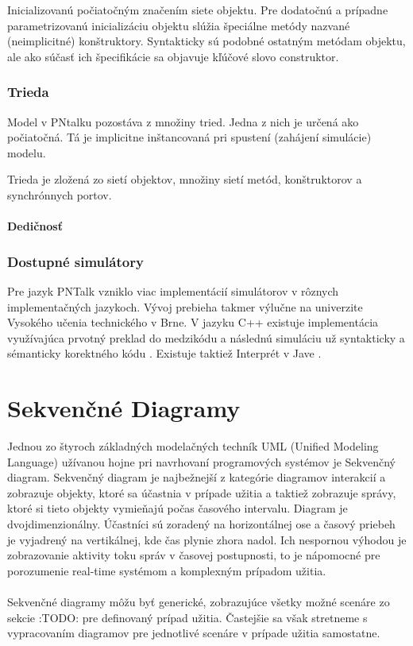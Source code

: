 Inicializovanú počiatočným značením siete objektu. Pre dodatočnú a prípadne parametrizovanú inicializáciu objektu slúžia špeciálne metódy nazvané (neimplicitné) konštruktory. Syntakticky sú podobné ostatným metódam objektu, ale ako súčasť ich špecifikácie sa objavuje kľúčové slovo construktor.

\subsection{Trieda}
Model v PNtalku pozostáva z množiny tried. Jedna z nich je určená ako počiatočná. Tá je implicitne inštancovaná pri spustení (zahájení simulácie) modelu.

Trieda je zložená zo sietí objektov, množiny sietí metód, konštruktorov a synchrónnych portov.

\subsubsection{Dedičnosť}

\subsection{Dostupné simulátory}
Pre jazyk PNTalk vzniklo viac implementácií simulátorov v rôznych implementačných jazykoch. Vývoj prebieha takmer výlučne na univerzite Vysokého učenia technického v Brne. V jazyku C++ existuje implementácia využívajúca prvotný preklad do medzikódu a následnú simuláciu už syntakticky a sémanticky korektného kódu \cite{FITBT21442}. Existuje taktiež Interprét v Jave \cite{FITMT22744}.


\chapter{Sekvenčné Diagramy}

Jednou zo štyroch základných modelačných techník UML (Unified Modeling Language) užívanou hojne pri navrhovaní programových systémov je Sekvenčný diagram. Sekvenčný diagram je najbežnejší z kategórie diagramov interakcií a zobrazuje objekty, ktoré sa účastnia v prípade užitia a taktiež zobrazuje správy, ktoré si tieto objekty vymieňajú počas časového intervalu. Diagram je dvojdimenzionálny. Účastníci sú zoradený na horizontálnej ose a časový priebeh je vyjadrený na vertikálnej, kde čas plynie zhora nadol. Ich nespornou výhodou je zobrazovanie aktivity toku správ v časovej postupnosti, to je nápomocné pre porozumenie real-time systémom a komplexným prípadom užitia. \\\\
Sekvenčné diagramy môžu byť generické, zobrazujúce všetky možné scenáre zo sekcie :TODO: pre definovaný prípad užitia. Častejšie sa však stretneme s vypracovaním diagramov pre jednotlivé scenáre v prípade užitia samostatne.


